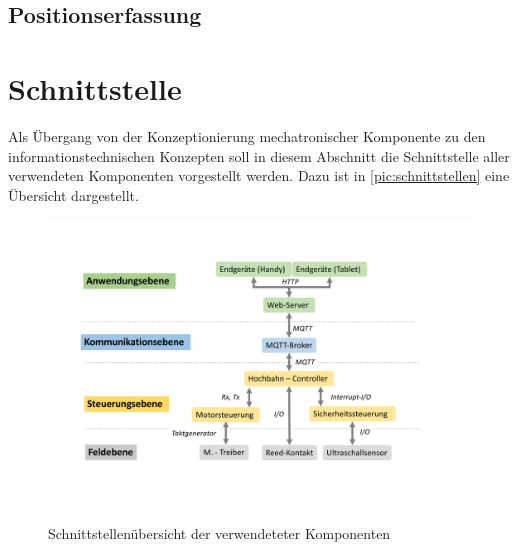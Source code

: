 \subsection{Positionserfassung}
\newpage
\section{Schnittstelle}
Als Übergang von der Konzeptionierung mechatronischer Komponente zu den informationstechnischen Konzepten soll in diesem Abschnitt die Schnittstelle aller verwendeten Komponenten vorgestellt werden. Dazu ist in \autoref{pic:schnittstellen} eine Übersicht dargestellt.

\begin{figure}[h]
	\centering
	\includegraphics[width=17cm]{schnittstellen.pdf}
	\caption{Schnittstellenübersicht der verwendeteter Komponenten}
	\label{pic:schnittstellen}
\end{figure}


